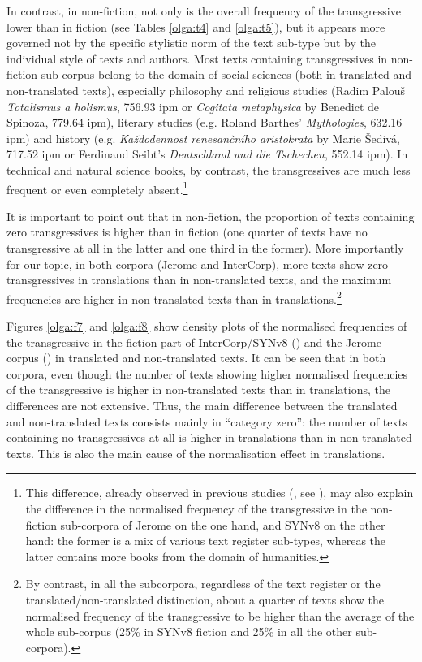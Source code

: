 \documentclass[output=paper,russian]{langsci/langscibook}
\begin{document}
In contrast, in non-fiction, not only is the overall frequency of the transgressive lower than in fiction (see Tables \ref{olga:t4} and \ref{olga:t5}), but it appears more governed not by the specific stylistic norm of the text sub-type but by the individual style of texts and authors. Most texts containing transgressives in non-fiction sub-corpus belong to the domain of social sciences (both in translated and non-translated texts), especially philosophy and religious studies (Radim Palouš \textit{Totalismus a holismus}, 756.93 ipm or \textit{Cogitata metaphysica} by Benedict de Spinoza, 779.64 ipm), literary studies (e.g. Roland Barthes’ \textit{Mythologies}, 632.16 ipm) and history (e.g. \textit{Každodennost renesančního aristokrata} by Marie Šedivá, 717.52 ipm or Ferdinand Seibt’s \textit{Deutschland und die Tschechen}, 552.14 ipm). In technical and natural science books, by contrast, the transgressives are much less frequent or even completely absent.\footnote{This difference, already observed in previous studies (\cite[106 and 108]{dvorak83}, see ), may also explain the difference in the normalised frequency of the transgressive in the non-fiction sub-corpora of Jerome on the one hand, and SYNv8 on the other hand: the former is a mix of various text register sub-types, whereas the latter contains more books from the domain of humanities.}

It is important to point out that in non-fiction, the proportion of texts containing zero transgressives is higher than in fiction (one quarter of texts have no transgressive at all in the latter and one third in the former). More importantly for our topic, in both corpora (Jerome and InterCorp), more texts show zero transgressives in translations than in non-translated texts, and the maximum frequencies are higher in non-translated texts than in translations.\footnote{By contrast, in all the subcorpora, regardless of the text register or the translated\slash non-translated distinction, about a quarter of texts show the normalised frequency of the transgressive to be higher than the average of the whole sub-corpus (25\% in SYNv8 fiction and 25\% in all the other sub-corpora).}

Figures \ref{olga:f7} and \ref{olga:f8} show density plots of the normalised frequencies of the transgressive in the fiction part of InterCorp/SYNv8 () and the Jerome corpus () in translated and non-translated texts. It can be seen that in both corpora, even though the number of texts showing higher normalised frequencies of the transgressive is higher in non-translated texts than in translations, the differences are not extensive. Thus, the main difference between the translated and non-translated texts consists mainly in \enquote{category zero}: the number of texts containing no transgressives at all is higher in translations than in non-translated texts. This is also the main cause of the normalisation effect in translations.
\end{document}
